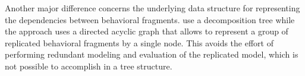 
Another major difference concerns the underlying data structure for representing
the dependencies between behavioral fragments.  \citet{ghezzi_model-based_2013}
use a decomposition tree while the approach uses a directed acyclic graph that
allows to represent a group of replicated behavioral fragments by a single node.
This avoids the effort of performing redundant modeling and evaluation of the
replicated model, which is not possible to accomplish in a tree structure.


